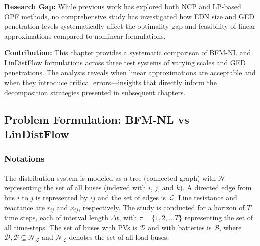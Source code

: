 \textbf{Research Gap:} While previous work has explored both NCP \cite{Gabash, Safdarian, Jha} and LP-based \cite{Li, Lei, spaul, Yang, Vaishya} OPF methods, no comprehensive study has investigated how EDN size and GED penetration levels systematically affect the optimality gap and feasibility of linear approximations compared to nonlinear formulations.

\textbf{Contribution:} This chapter provides a systematic comparison of BFM-NL and LinDistFlow formulations across three test systems of varying scales and GED penetrations. The analysis reveals when linear approximations are acceptable and when they introduce critical errors—insights that directly inform the decomposition strategies presented in subsequent chapters.

\subsection{Problem Formulation: BFM-NL vs LinDistFlow}

\subsubsection{Notations}
The distribution system is modeled as a tree (connected graph) with $\mathcal{N}$ representing the set of all buses (indexed with \(i\), \(j\), and \(k\)). A directed edge from bus $i$ to $j$ is represented by $ij$ and the set of edges is $\mathcal{L}$. Line resistance and reactance are \(r_{ij}\) and \(x_{ij}\), respectively. The study is conducted for a horizon of $T$ time steps, each of interval length $\Delta t$, with $\tau = \{1, 2, \ldots T\}$ representing the set of all time-steps. The set of buses with PVs is $\mathcal{D}$ and with batteries is $\mathcal{B}$, where $\mathcal{D}, \mathcal{B} \subseteq \mathcal{N_L}$ and $\mathcal{N_L}$ denotes the set of all load buses.

